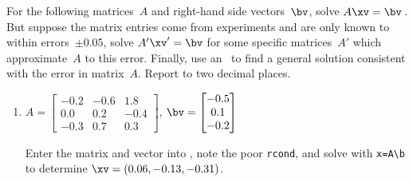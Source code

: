\begin{example} \label{eg:3regmat}
For the following matrices~\(A\) and right-hand side vectors~\(\bv\),
solve \(A\xv=\bv\)\,.
But suppose the matrix entries come from experiments and are only known to within errors~\(\pm0.05\),  solve \(A'\xv'=\bv\) for some specific matrices~\(A'\) which approximate~\(A\) to this error.
Finally, use an \svd\ to find a general solution consistent with the error in matrix~\(A\).
Report to two decimal places.
\begin{enumerate}
\item\label{eg:3regmata} \(A=\begin{bmatrix} -0.2&-0.6&1.8
\\ 0.0&0.2&-0.4
\\ -0.3&0.7&0.3 \end{bmatrix}\),
\(\bv=\begin{bmatrix} -0.5
\\ 0.1
\\ -0.2
 \end{bmatrix}\)
\begin{solution} 
Enter the matrix and vector into \script, note the poor \verb|rcond|, and solve with \verb|x=A\b| to determine \(\xv=(0.06,-0.13,-0.31)\).
\setbox\ajrqrbox\hbox{}%
\marginpar{\usebox{\ajrqrbox\\[2ex]}}%


\end{solution}
\end{enumerate}
\end{example}
